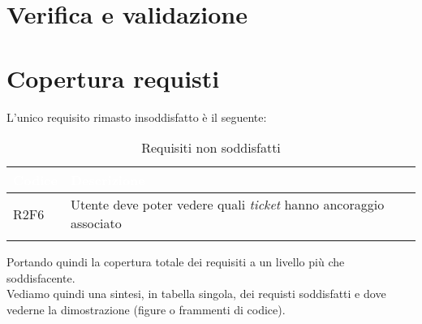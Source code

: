 \section{Verifica e validazione}

\section{Copertura requisti}
L'unico requisito rimasto insoddisfatto è il seguente:
{
    \setlength{\freewidth}{\dimexpr\textwidth-10\tabcolsep}
    \renewcommand{\arraystretch}{1.5}
    \centering
    \setlength{\aboverulesep}{0pt}
    \setlength{\belowrulesep}{0pt}
    \begin{longtable}{C{.15\freewidth} C{.965\freewidth}} 
       \toprule
    \textcolor{white}{\textbf{Codice}}&
    \textcolor{white}{\textbf{Descrizione}}\\
    \toprule
    \endhead

    R2F6 & Utente deve poter vedere quali \textit{ticket} hanno ancoraggio associato\\

    \bottomrule
    \caption{Requisiti non soddisfatti}
    \end{longtable}
}

Portando quindi la copertura totale dei requisiti a un livello più che soddisfacente.\\
Vediamo quindi una sintesi, in tabella singola, dei requisti soddisfatti e dove vederne la dimostrazione (figure o frammenti di codice).

